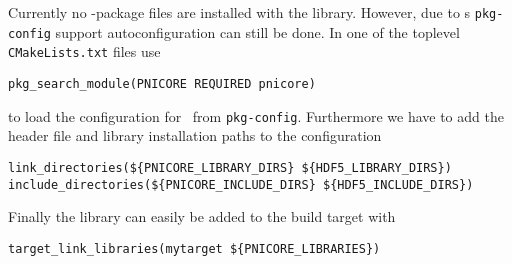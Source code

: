 Currently no \cmake-package files are installed with the library. However, due
to \cmake s \texttt{pkg-config} support autoconfiguration can still be done. In one
of the toplevel \texttt{CMakeLists.txt} files use
\begin{verbatim}
pkg_search_module(PNICORE REQUIRED pnicore)
\end{verbatim}
to load the configuration for \libpnicore\ from \texttt{pkg-config}. Furthermore we
have to add the header file and library installation paths to the configuration
\begin{verbatim}
link_directories(${PNICORE_LIBRARY_DIRS} ${HDF5_LIBRARY_DIRS})
include_directories(${PNICORE_INCLUDE_DIRS} ${HDF5_INCLUDE_DIRS})
\end{verbatim}
Finally the library can easily be added to the build target with 
\begin{verbatim}
target_link_libraries(mytarget ${PNICORE_LIBRARIES})
\end{verbatim}

